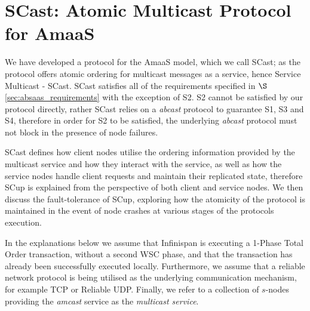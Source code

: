 \section{SCast: Atomic Multicast Protocol for AmaaS}\label{sec:scast_protocol}
We have developed a protocol for the \textsf{AmaaS} model, which we call \textsf{SCast}; as the protocol offers atomic ordering for multicast messages as a service, hence Service Multicast - \textsf{SCast}.  \textsf{SCast} satisfies all of the requirements specified in $\S$ \ref{sec:absaas_requirements} with the exception of S2.  S2 cannot be satisfied by our protocol directly, rather \textsf{SCast} relies on a \emph{abcast} protocol to guarantee S1, S3 and S4, therefore in order for S2 to be satisfied, the underlying \emph{abcast} protocol must not block in the presence of node failures.  

\textsf{SCast} defines how client nodes utilise the ordering information provided by the multicast service and how they interact with the service, as well as how the service nodes handle client requests and maintain their replicated state, therefore \textsf{SCup} is explained from the perspective of both client and service nodes.  We then discuss the fault-tolerance of \textsf{SCup}, exploring how the atomicity of the protocol is maintained in the event of node crashes at various stages of the protocols execution.  

In the explanations below we assume that Infinispan is executing a 1-Phase Total Order transaction, without a second WSC phase, and that the transaction has already been successfully executed locally.  Furthermore, we assume that a reliable network protocol is being utilised as the underlying communication mechanism, for example TCP\citep{Cerf:2005:PPN:1064413.1064423} or Reliable UDP\citep{ReliableUDP}.  Finally, we refer to a collection of $s$-nodes providing the \emph{amcast} service as the \emph{multicast service}.  


